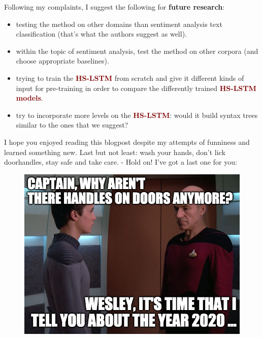 \documentclass{article}
\begin{document}
Following my complaints, I suggest the following for \textbf{future research}: 
\begin{itemize}
    \item testing the method on other domains than sentiment analysis text classification (that's what the authors suggest as well).
    \item within the topic of sentiment analysis, test the method on other corpora (and choose appropriate baselines).
    \item trying to train the \textcolor{Maroon}{\textbf{HS-LSTM}} from scratch and give it different kinds of input for pre-training in order to compare the differently trained \textcolor{Maroon}{\textbf{HS-LSTM models}}.
    \item try to incorporate more levels on the \textcolor{Maroon}{\textbf{HS-LSTM}}: would it build syntax trees similar to the ones that we suggest?
\end{itemize}

I hope you enjoyed reading this blogpost despite my attempts of funniness and learned something new. Last but not least: wash your hands, don't lick doorhandles, stay safe and take care. - Hold on! I've got a last one for you:

\begin{figure}[h]
    \centering
\includegraphics[scale=.4]{doors.png}
\end{figure}
\printbibliography
\end{document}
